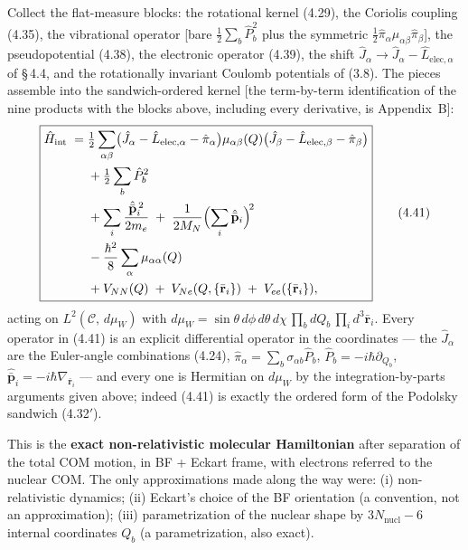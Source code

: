 Collect the flat-measure blocks: the rotational kernel (4.29), the Coriolis coupling (4.35), the vibrational operator [bare $\tfrac12\sum_b\hat P_b^2$ plus the symmetric $\tfrac12\hat\pi_\alpha\mu_{\alpha\beta}\hat\pi_\beta$], the pseudopotential (4.38), the electronic operator (4.39), the shift $\hat J_\alpha\to\hat J_\alpha-\hat L_{\mathrm{elec},\alpha}$ of \S\,4.4, and the rotationally invariant Coulomb potentials of (3.8). The pieces assemble into the sandwich-ordered kernel [the term-by-term identification of the nine products with the blocks above, including every derivative, is Appendix~B]:
\begin{equation}
\boxed{
\begin{aligned}
\hat H_{\mathrm{int}}\;=\;& \tfrac12\sum_{\alpha\beta}\bigl(\hat J_\alpha - \hat L_{\mathrm{elec},\alpha} - \hat\pi_\alpha\bigr)\mu_{\alpha\beta}(Q)\bigl(\hat J_\beta - \hat L_{\mathrm{elec},\beta} - \hat\pi_\beta\bigr) \\
& + \tfrac12\sum_b\hat P_b^2 \\
& + \sum_i\frac{\hat{\bar{\mathbf{p}}}_i^{\,2}}{2m_e} \;+\; \frac{1}{2M_N}\Bigl(\sum_i\hat{\bar{\mathbf{p}}}_i\Bigr)^{\!2} \\
& - \frac{\hbar^{2}}{8}\sum_{\alpha}\mu_{\alpha\alpha}(Q) \\
& + V_{NN}(Q) \;+\; V_{Ne}(Q,\{\bar{\mathbf{r}}_i\}) \;+\; V_{ee}(\{\bar{\mathbf{r}}_i\}),
\end{aligned}}\tag{4.41}
\end{equation}
acting on $L^{2}(\mathcal{C},\,d\mu_W)$ with $d\mu_W = \sin\theta\,d\phi\, d\theta\, d\chi\,\prod_b dQ_b\,\prod_i d^{3}\bar{\mathbf{r}}_i$. Every operator in (4.41) is an explicit differential operator in the coordinates --- the $\hat J_\alpha$ are the Euler-angle combinations (4.24), $\hat\pi_\alpha=\sum_b\sigma_{\alpha b}\hat P_b$, $\hat P_b=-i\hbar\partial_{Q_b}$, $\hat{\bar{\mathbf p}}_i=-i\hbar\nabla_{\bar{\mathbf r}_i}$ --- and every one is Hermitian on $d\mu_W$ by the integration-by-parts arguments given above; indeed (4.41) is exactly the ordered form of the Podolsky sandwich (4.32$'$).

This is the \textbf{exact non-relativistic molecular Hamiltonian} after separation of the total COM motion, in BF + Eckart frame, with electrons referred to the nuclear COM. The only approximations made along the way were: (i) non-relativistic dynamics; (ii) Eckart's choice of the BF orientation (a convention, not an approximation); (iii) parametrization of the nuclear shape by $3N_{\mathrm{nucl}}-6$ internal coordinates $Q_b$ (a parametrization, also exact).

